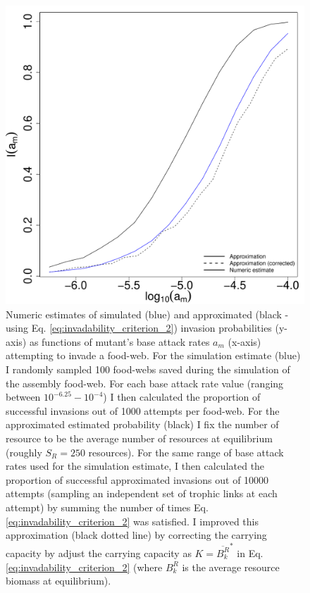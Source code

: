 \documentclass[a4paper]{report}
\begin{document}
\begin{figure}[H]
 
\centering{}
\includegraphics[scale=0.5]{../Images/Invasion_verification.pdf}
 \caption{Numeric estimates of simulated (blue) and approximated (black - using Eq. \eqref{eq:invadability_criterion_2}) invasion probabilities (y-axis) as functions of mutant's base attack rates $a_m$ (x-axis) attempting to invade a food-web. For the simulation estimate (blue) I randomly sampled 100 food-webs saved during the simulation of the assembly food-web. For each base attack rate value (ranging between $10^{-6.25}-10^{-4}$) I then calculated the proportion of successful invasions out of 1000 attempts per food-web. For the approximated estimated probability (black) I fix the number of resource to be the average number of resources at equilibrium (roughly $S_R=250$ resources). For the same range of base attack rates used for the simulation estimate, I then calculated the proportion of successful approximated invasions out of 10000 attempts (sampling an independent set of trophic links at each attempt) by summing the number of times Eq. \eqref{eq:invadability_criterion_2} was satisfied. I improved this approximation (black dotted line) by correcting the carrying capacity by adjust the carrying capacity as $K=\overline{B_{k}^{R}}^{*}$ in Eq. \eqref{eq:invadability_criterion_2} (where $B_{k}^{R}$ is the average resource biomass at equilibrium). 
\label{fig:birth_verification}}
\end{figure}
 
\end{document}
